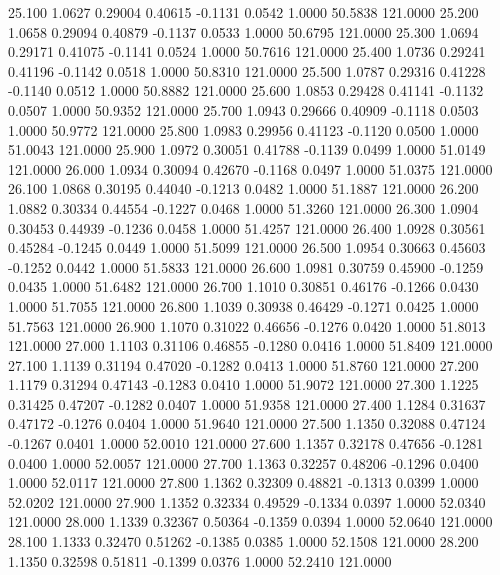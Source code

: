   25.100   1.0627   0.29004   0.40615  -0.1131   0.0542   1.0000  50.5838 121.0000
  25.200   1.0658   0.29094   0.40879  -0.1137   0.0533   1.0000  50.6795 121.0000
  25.300   1.0694   0.29171   0.41075  -0.1141   0.0524   1.0000  50.7616 121.0000
  25.400   1.0736   0.29241   0.41196  -0.1142   0.0518   1.0000  50.8310 121.0000
  25.500   1.0787   0.29316   0.41228  -0.1140   0.0512   1.0000  50.8882 121.0000
  25.600   1.0853   0.29428   0.41141  -0.1132   0.0507   1.0000  50.9352 121.0000
  25.700   1.0943   0.29666   0.40909  -0.1118   0.0503   1.0000  50.9772 121.0000
  25.800   1.0983   0.29956   0.41123  -0.1120   0.0500   1.0000  51.0043 121.0000
  25.900   1.0972   0.30051   0.41788  -0.1139   0.0499   1.0000  51.0149 121.0000
  26.000   1.0934   0.30094   0.42670  -0.1168   0.0497   1.0000  51.0375 121.0000
  26.100   1.0868   0.30195   0.44040  -0.1213   0.0482   1.0000  51.1887 121.0000
  26.200   1.0882   0.30334   0.44554  -0.1227   0.0468   1.0000  51.3260 121.0000
  26.300   1.0904   0.30453   0.44939  -0.1236   0.0458   1.0000  51.4257 121.0000
  26.400   1.0928   0.30561   0.45284  -0.1245   0.0449   1.0000  51.5099 121.0000
  26.500   1.0954   0.30663   0.45603  -0.1252   0.0442   1.0000  51.5833 121.0000
  26.600   1.0981   0.30759   0.45900  -0.1259   0.0435   1.0000  51.6482 121.0000
  26.700   1.1010   0.30851   0.46176  -0.1266   0.0430   1.0000  51.7055 121.0000
  26.800   1.1039   0.30938   0.46429  -0.1271   0.0425   1.0000  51.7563 121.0000
  26.900   1.1070   0.31022   0.46656  -0.1276   0.0420   1.0000  51.8013 121.0000
  27.000   1.1103   0.31106   0.46855  -0.1280   0.0416   1.0000  51.8409 121.0000
  27.100   1.1139   0.31194   0.47020  -0.1282   0.0413   1.0000  51.8760 121.0000
  27.200   1.1179   0.31294   0.47143  -0.1283   0.0410   1.0000  51.9072 121.0000
  27.300   1.1225   0.31425   0.47207  -0.1282   0.0407   1.0000  51.9358 121.0000
  27.400   1.1284   0.31637   0.47172  -0.1276   0.0404   1.0000  51.9640 121.0000
  27.500   1.1350   0.32088   0.47124  -0.1267   0.0401   1.0000  52.0010 121.0000
  27.600   1.1357   0.32178   0.47656  -0.1281   0.0400   1.0000  52.0057 121.0000
  27.700   1.1363   0.32257   0.48206  -0.1296   0.0400   1.0000  52.0117 121.0000
  27.800   1.1362   0.32309   0.48821  -0.1313   0.0399   1.0000  52.0202 121.0000
  27.900   1.1352   0.32334   0.49529  -0.1334   0.0397   1.0000  52.0340 121.0000
  28.000   1.1339   0.32367   0.50364  -0.1359   0.0394   1.0000  52.0640 121.0000
  28.100   1.1333   0.32470   0.51262  -0.1385   0.0385   1.0000  52.1508 121.0000
  28.200   1.1350   0.32598   0.51811  -0.1399   0.0376   1.0000  52.2410 121.0000
